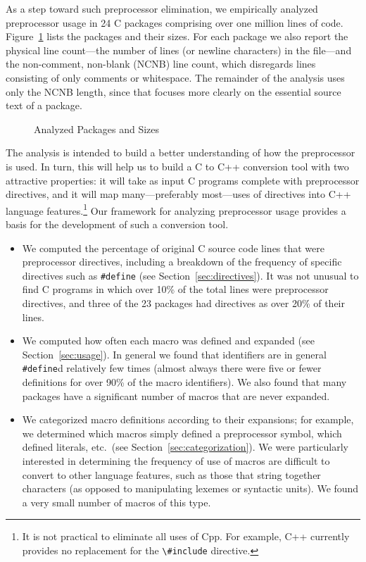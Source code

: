 As a step toward such preprocessor elimination, we empirically analyzed
preprocessor usage in 24 C packages comprising over one million lines of
code.  Figure~\ref{fig:packages} lists the packages and their sizes.
For each package we also report the physical line count---the
number of lines (or newline characters) in the file---and the non-comment,
non-blank (NCNB) line count, which disregards lines consisting of only
comments or whitespace.  The remainder of the analysis uses only the NCNB
length, since that focuses more clearly on the essential source text of a
package.

\begin{figure}
\centering
{\small
  \setlength{\tabcolsep}{.25em}
  
}
\caption{Analyzed Packages and Sizes\label{fig:packages}}
\end{figure}

The analysis is intended to build a better understanding of how the
preprocessor is used.  In turn, this will help us to build a C to C++
conversion tool with two attractive properties: it will take as input C
programs complete with preprocessor directives, and it will map
many---preferably most---uses of directives into C++ language
features.\footnote{It is not practical to eliminate all uses of Cpp.  For
  example, C++ currently provides no replacement for the \verb+\#include+
  directive.} Our framework for analyzing preprocessor usage provides a
basis for the development of such a conversion tool.

\begin{itemize}\itemsep 0pt \parskip 0pt

\item We computed the percentage of original C source code lines that
were preprocessor directives, including a breakdown of the frequency
of specific directives such as \verb+#define+ (see
Section~\ref{sec:directives}). It was not unusual to find C programs 
in which over 10\% of the total lines were preprocessor directives, and 
three of the 23 packages had directives as over 20\% of their lines.

\item We computed how often each macro was defined and expanded (see
Section~\ref{sec:usage}).  In general we found that identifiers are in
general \verb+#define+d relatively few times (almost always there were
five or fewer definitions for over 90\% of the macro identifiers).  We
also found that many packages have a significant number of
macros that are never expanded.  


\item We categorized macro definitions according to their expansions;
for example, we determined which macros simply defined a preprocessor
symbol, which defined literals, etc.~(see
Section~\ref{sec:categorization}).  We were particularly interested in
determining the frequency of use of macros are difficult to convert to
other language features, such as those that string together characters
(as opposed to manipulating lexemes or syntactic units).  We found a
very small number of macros of this type.
\end{itemize}


